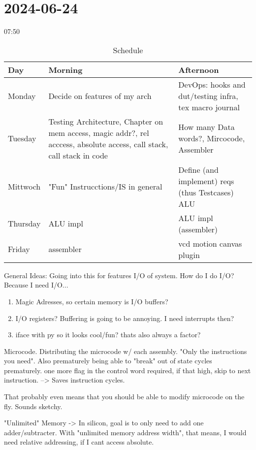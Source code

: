 \chapter{2024-06-24} %
\label{chap:2024-06-24}
07:50
\begin{table}
  \caption{Schedule}\label{tab:}
  \begin{center}
    \begin{tabular}[c]{l|l|l}
      \hline
      Day & Morning & Afternoon \\
      \hline
      Monday & Decide on features of my arch & DevOps: hooks and dut/testing infra, tex macro journal \\
      Tuesday & Testing Architecture, Chapter on mem access, magic addr?, rel acccess, absolute access, call stack, call stack in code & How many Data words?, Mircocode, Assembler \\
      Mittwoch & "Fun" Instrucctions/IS in general & Define (and implement) reqs (thus Testcases) ALU \\
      Thursday & ALU impl & ALU impl (assembler) \\
      Friday & assembler & vcd motion canvas plugin \\
      
      \hline
    \end{tabular}
  \end{center}
\end{table}

General Ideas: Going into this for features
I/O of system. How do I do I/O? Because I need I/O...
\begin{enumerate}
  \item Magic Adresses, so certain memory is I/O buffers?
  \item I/O registers? Buffering is going to be annoying. I need interrupts then?
  \item iface with py so it looks cool/fun? thats also always a factor? 
\end{enumerate}

Microcode. 
Distributing the microcode w/ each assembly. 
"Only the instructions you need". 
Also prematurely being able to "break" out of state cycles prematurely. one more flag in the control word required, if that high, skip to next instruction. 
--> Saves instruction cycles. 

That probably even means that you should be able to modify microcode on the fly. Sounds sketchy. 


"Unlimited" Memory -> In silicon, goal is to only need to add one adder/subtracter. 
With "unlimited memory address width", that means, I would need relative addressing, if I cant access absolute. 

